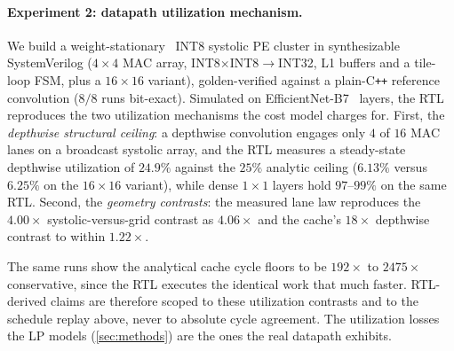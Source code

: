 \paragraph{Experiment 2: datapath utilization mechanism.}
We build a weight-stationary~\citep{chen2016eyeriss,kwon2020understandingreuseperformancehardware} INT8 systolic PE cluster in synthesizable SystemVerilog ($4\times4$ MAC array, INT8$\times$INT8$\rightarrow$INT32, L1 buffers and a tile-loop FSM, plus a $16\times16$ variant), golden-verified against a plain-C\texttt{++} reference convolution ($8/8$ runs bit-exact).
Simulated on EfficientNet-B7~\citep{tan2019efficientnet} layers, the RTL reproduces the two utilization mechanisms the cost model charges for.
First, the \emph{depthwise structural ceiling}: a depthwise convolution engages only $4$ of $16$ MAC lanes on a broadcast systolic array, and the RTL measures a steady-state depthwise utilization of $24.9\%$ against the $25\%$ analytic ceiling ($6.13\%$ versus $6.25\%$ on the $16\times16$ variant), while dense $1\times1$ layers hold $97$--$99\%$ on the same RTL.
Second, the \emph{geometry contrasts}: the measured lane law reproduces the $4.00\times$ systolic-versus-grid contrast as $4.06\times$ and the cache's $18\times$ depthwise contrast to within $1.22\times$.

The same runs show the analytical cache cycle floors to be $192\times$ to $2475\times$ conservative, since the RTL executes the identical work that much faster.
RTL-derived claims are therefore scoped to these utilization contrasts and to the schedule replay above, never to absolute cycle agreement.
The utilization losses the LP models (\cref{sec:methods}) are the ones the real datapath exhibits.

